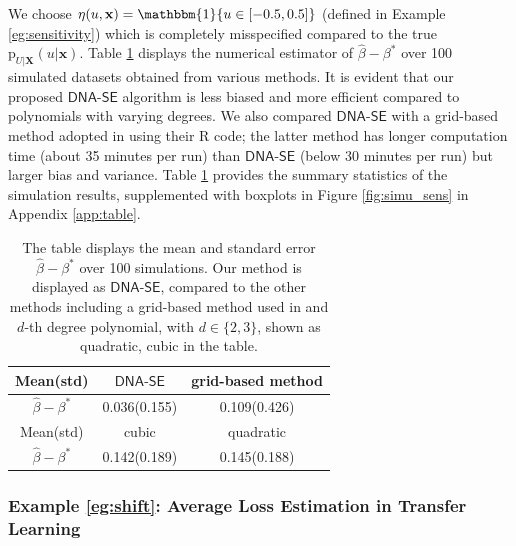\documentclass{article}
\def\dnase{{\mathsf{DNA\mbox{-}SE}}}
\def\bfX{\mathbf{X}}
\def\bfx{\mathbf{x}}
\theoremstyle{plain}
\theoremstyle{definition}
\theoremstyle{remark}
\def\hat{\widehat}
\def\p{\mathrm{p}}
\begin{document}
We choose $\eta (u, \mathbf{x}) = \mathbbm{1} \{u \in [-0.5, 0.5]\}$ (defined in Example \ref{eg:sensitivity}) which is completely misspecified compared to the true $\p_{U | \bfX} (u | \bfx)$. Table \ref{table:simu_2} displays the numerical estimator of $\hat{\beta} - \beta^{\ast}$ over 100 simulated datasets obtained from various methods. It is evident that our proposed $\dnase$ algorithm is less biased and more efficient compared to polynomials with varying degrees. We also compared $\dnase$ with a grid-based method adopted in \citet{zhang2022semi} using their R code; the latter method has longer computation time (about 35 minutes per run) than $\dnase$ (below 30 minutes per run) but larger bias and variance. Table \ref{table:simu_2} provides the summary statistics of the simulation results, supplemented with boxplots in Figure \ref{fig:simu_sens} in Appendix \ref{app:table}.

\begin{table}[htbp]
\caption{The table displays the mean and standard error $\hat{\beta}-\beta^{\ast}$ over 100 simulations. Our method is displayed as $\dnase$, compared to the other methods including a grid-based method used in \citet{zhang2022semi} and $d$-th degree polynomial, with $d \in \{2, 3\}$, shown as quadratic, cubic in the table.}
\label{table:simu_2}
\begin{center}
\begin{small}
\begin{sc}
\vskip 0.1in
\begin{tabular}{ccc}
\toprule
Mean(std)    & $\dnase$  & grid-based method \\
\midrule
$\hat{\beta} - \beta^\ast$ & 0.036(0.155) & 0.109(0.426)  \\ 
\toprule
Mean(std)    & cubic & quadratic  \\
\midrule
$\hat{\beta} - \beta^\ast$ &  0.142(0.189) & 0.145(0.188)   \\ 
\bottomrule
\end{tabular}
\end{sc}
\end{small}
\end{center}
\end{table}

\subsubsection{Example \ref{eg:shift}: Average Loss Estimation in Transfer Learning}
\end{document}
